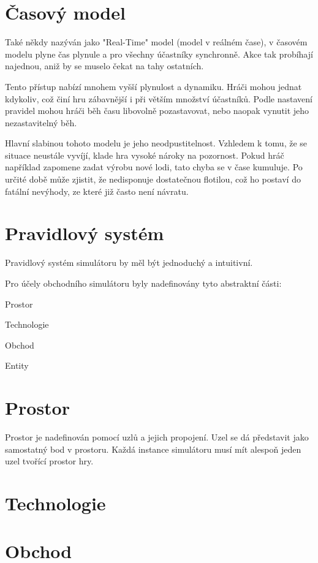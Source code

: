 \documentclass[FM,BP]{tulthesis}
\newenvironment{myquote}{\begin{list}{}{\setlength\leftmargin\parindent}\item[]}{\end{list}}
\newenvironment{listing}{\begin{myquote}\color{\tulcolor}}{\end{myquote}}
\begin{document}
\section{Časový model}
Také někdy nazýván jako "Real-Time" model (model v reálném čase), v časovém modelu plyne čas plynule a pro všechny účastníky synchronně. Akce tak probíhají najednou, aniž by se muselo čekat na tahy ostatních.

Tento přístup nabízí mnohem vyšší plynulost a dynamiku. Hráči mohou jednat kdykoliv, což činí hru zábavnější i při větším množství účastníků. Podle nastavení pravidel mohou hráči běh času libovolně pozastavovat, nebo naopak vynutit jeho nezastavitelný běh.

Hlavní slabinou tohoto modelu je jeho neodpustitelnost. Vzhledem k tomu, že se situace neustále vyvíjí, klade hra vysoké nároky na pozornost. Pokud hráč například zapomene zadat výrobu nové lodi, tato chyba se v čase kumuluje. Po určité době může zjistit, že nedisponuje dostatečnou flotilou, což ho postaví do fatální nevýhody, ze které již často není návratu.

\section{Pravidlový systém}
Pravidlový systém simulátoru by měl být jednoduchý a intuitivní.

Pro účely obchodního simulátoru byly nadefinovány tyto abstraktní části:
\begin{listing}
  \item Prostor
  \item Technologie
  \item Obchod
  \item Entity
\end{listing}

\section{Prostor}
Prostor je nadefinován pomocí uzlů a jejich propojení. Uzel se dá představit jako samostatný bod v prostoru. Každá instance simulátoru musí mít alespoň jeden uzel tvořící prostor hry.

\section{Technologie}

\section{Obchod}
\end{document}
